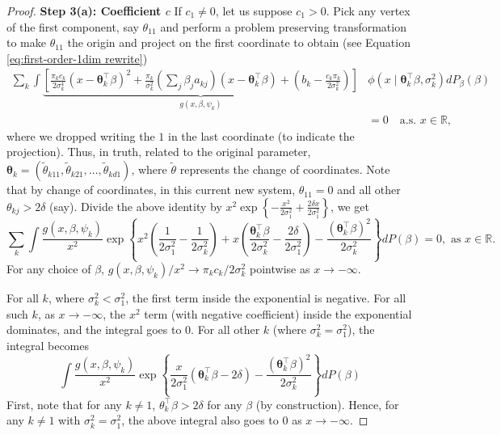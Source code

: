 \documentclass[bj,authoryear]{imsart}
\theoremstyle{plain}
\theoremstyle{remark}
\def\btheta{{\boldsymbol\theta}}
\def\bbR{\mathbb{R}}
\begin{document}
\begin{appendix}
\begin{proof}
    \vspace{0.5em}
    \textbf{Step 3(a): Coefficient $c$} If $c_1\neq 0$, let us suppose $c_1>0$. Pick any vertex of the first component, say $\theta_{11}$ and perform a problem preserving transformation to make $\theta_{11}$ the origin and project on the first coordinate to obtain (see Equation \eqref{eq:first-order-1dim rewrite})
    \begin{align}
        \sum_k \int \underbrace{\left[\frac{\pi_k c_k}{2\sigma_k^4} (x - \btheta_{k}^\top \beta)^2 + \frac{\pi_k}{\sigma_k^2}(\sum_j \beta_j a_{kj}) (x - \btheta_{k}^\top\beta) + \left(b_k - \frac{c_k \pi_k}{2\sigma_k^2}\right)\right]}_{g(x,\beta,\psi_k)}&\phi(x\mid \btheta_{k}^\top\beta, \sigma_k^2)dP_{\beta}(\beta) \nonumber\\
        &=0 \quad \text{a.s. } x\in\bbR,
    \end{align}
    where we dropped writing the $1$ in the last coordinate (to indicate the projection). Thus, in truth, related to the original parameter, $\btheta_k = (\tilde{\theta}_{k11},\tilde{\theta}_{k21},\dots,\tilde{\theta}_{kd1})$, where $\tilde{\theta}$ represents the change of coordinates. Note that by change of coordinates, in this current new system, $\theta_{11}=0$ and all other $\theta_{kj}>2\delta$ (say). Divide the above identity by $x^2 \exp\left\{-\frac{x^2}{2\sigma_1^2} + \frac{2\delta x}{2\sigma_1^2}\right\}$, we get
    \begin{equation}\label{eq:proof_inverse2}
        \sum_k \int \frac{g(x,\beta,\psi_k)}{x^2} \exp \left\{x^2\left(\frac{1}{2\sigma_1^2}-\frac{1}{2\sigma_k^2}\right) + x\left(\frac{\btheta_k^\top\beta}{2\sigma_k^2} - \frac{2\delta}{2\sigma_1^2}\right) - \frac{(\btheta_k^\top\beta)^2}{2\sigma_k^2}\right\} dP(\beta)= 0, \text{ as } x\in \bbR.
    \end{equation}
    For any choice of $\beta$, $g(x,\beta,\psi_k)/x^2 \to \pi_k c_k/2\sigma_k^2$ pointwise as $x\to -\infty$. 
    
    For all $k$, where $\sigma_k^2< \sigma_1^2$, the first term inside the exponential is negative. For all such $k$, as $x\to-\infty$, the $x^2$ term (with negative coefficient) inside the exponential dominates, and the integral goes to 0. For all other $k$ (where $\sigma_k^2=\sigma_1^2$), the integral becomes
    \begin{equation}
        \int \frac{g(x,\beta,\psi_k)}{x^2} \exp \left\{ \frac{x}{2\sigma_1^2}\left(\btheta_k^\top\beta - 2\delta\right) - \frac{(\btheta_k^\top\beta)^2}{2\sigma_k^2}\right\} dP(\beta)
    \end{equation}
    First, note that for any $k\neq 1$, $\theta_k^\top\beta > 2\delta$ for any $\beta$ (by construction). Hence, for any $k\neq 1$ with $\sigma_k^2=\sigma_1^2$, the above integral also goes to 0 as $x\to -\infty$.
    

\end{proof}
\end{appendix}
\end{document}

